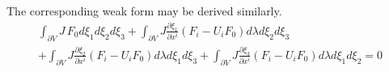 The corresponding weak form may be derived similarly.
\begin{equation}
\label{eq:UCS-Euler-UCS-weak}
\begin{array}{l}
\int_{\partial V} {J\,{F_0}d{\xi _1}d{\xi _2}d{\xi _3}}  + \int_{\partial V} {J\frac{{\partial {\xi _1}}}{{\partial {x^i}}}\left( {{F_i} - {U_i}{F_0}} \right)d{\lambda}d{\xi _2}d{\xi _3}} \\
 + \int_{\partial V} {J\frac{{\partial {\xi _2}}}{{\partial {x^i}}}\left( {{F_i} - {U_i}{F_0}} \right)d{\lambda}d{\xi _1}d{\xi _3}}  + \int_{\partial V} {J\frac{{\partial {\xi _3}}}{{\partial {x^i}}}\left( {{F_i} - {U_i}{F_0}} \right)d{\lambda}d{\xi _1}d{\xi _2}} =0
\end{array}
\end{equation}

